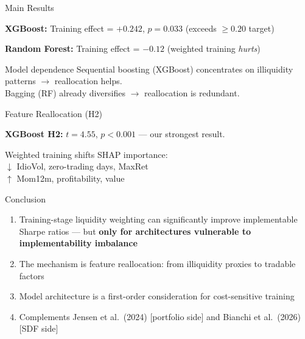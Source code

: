\documentclass[10pt]{beamer}
\begin{document}

\begin{frame}{Main Results}

\vspace{1em}
\textbf{XGBoost:} Training effect = $+0.242$, $p = 0.033$ (exceeds $\geq 0.20$ target)

\textbf{Random Forest:} Training effect = $-0.12$ (weighted training \textit{hurts})

\vspace{1em}
\begin{block}{Model dependence}
Sequential boosting (XGBoost) concentrates on illiquidity patterns $\rightarrow$ reallocation helps.\\
Bagging (RF) already diversifies $\rightarrow$ reallocation is redundant.
\end{block}
\end{frame}


\begin{frame}{Feature Reallocation (H2)}

\vspace{1em}
\textbf{XGBoost H2:} $t = 4.55$, $p < 0.001$ --- our strongest result.

Weighted training shifts SHAP importance: \\
\quad $\downarrow$ IdioVol, zero-trading days, MaxRet \\
\quad $\uparrow$ Mom12m, profitability, value
\end{frame}



\begin{frame}{Conclusion}
\begin{enumerate}
  \item Training-stage liquidity weighting can significantly improve implementable Sharpe ratios --- but \textbf{only for architectures vulnerable to implementability imbalance}
  \item The mechanism is feature reallocation: from illiquidity proxies to tradable factors
  \item Model architecture is a first-order consideration for cost-sensitive training
  \item Complements Jensen et al.\ (2024) [portfolio side] and Bianchi et al.\ (2026) [SDF side]
\end{enumerate}
\end{frame}
\end{document}
